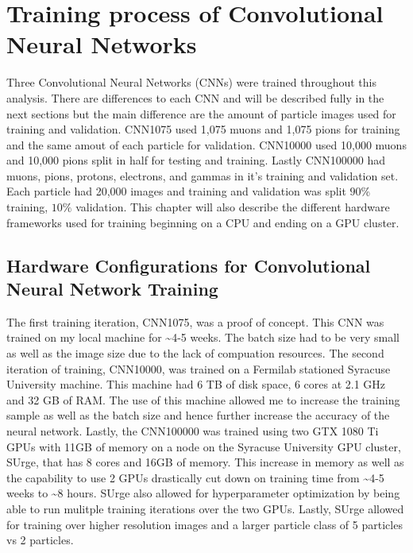 \chapter{Training process of Convolutional Neural Networks}\label{ch:cnn_train}
Three Convolutional Neural Networks (CNNs) were trained throughout this analysis. There are differences to each CNN and will be described fully in the next sections but the main difference are the amount of particle images used for training and validation. CNN1075 used 1,075 muons and 1,075 pions for training and the same amout of each particle for validation. CNN10000 used 10,000 muons and 10,000 pions split in half for testing and training. Lastly CNN100000 had muons, pions, protons, electrons, and gammas in it's training and validation set. Each particle had 20,000 images and training and validation was split $90\%$ training, $10\%$ validation. This chapter will also describe the different hardware frameworks used for training beginning on a CPU and ending on a GPU cluster. 




\section{Hardware Configurations for Convolutional Neural Network Training}\label{research approach}
The first training iteration, CNN1075, was a proof of concept. This CNN was trained on my local machine for \sim 4-5 weeks. The batch size had to be very small as well as the image size due to the lack of compuation resources. The second iteration of training, CNN10000, was trained on a Fermilab stationed Syracuse University machine. This machine had 6 TB of disk space, 6 cores at 2.1 GHz and 32 GB of RAM. The use of this machine allowed me to increase the training sample as well as the batch size and hence further increase the accuracy of the neural network. Lastly, the CNN100000 was trained using two GTX 1080 Ti GPUs with 11GB of memory on a node on the Syracuse University GPU cluster, SUrge, that has 8 cores and 16GB of memory. This increase in memory as well as the capability to use 2 GPUs drastically cut down on training time from \sim 4-5 weeks to \sim 8 hours. SUrge also allowed for hyperparameter optimization by being able to run mulitple training iterations over the two GPUs. Lastly, SUrge allowed for training over higher resolution images and a larger particle class of 5 particles vs 2 particles. 


